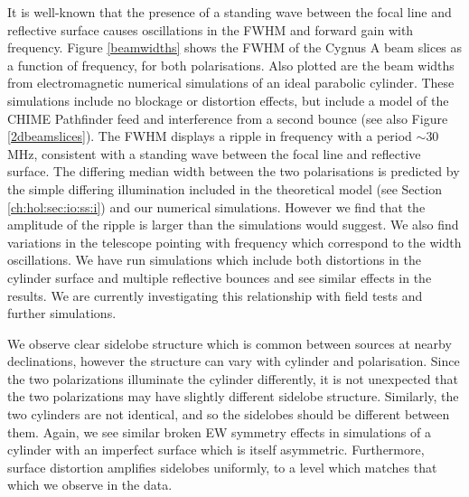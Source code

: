 It is well-known \citep{wander1, wander2} that the presence of a standing wave between the focal line and reflective surface causes oscillations in the FWHM and forward gain with frequency. Figure \ref{beamwidths} shows the FWHM of the Cygnus A beam slices as a function of frequency, for both polarisations. Also plotted are the beam widths from electromagnetic numerical simulations of an ideal parabolic cylinder. These simulations include no blockage or distortion effects, but include a model of the CHIME Pathfinder feed \citep{meiling} and interference from a second bounce (see also Figure \ref{2dbeamslices}). The FWHM displays a ripple in frequency with a period $\sim$30 MHz, consistent with a standing wave between the focal line and reflective surface. The differing median width between the two polarisations is predicted by the simple differing illumination included in the theoretical model (see Section \ref{ch:hol:sec:io:ss:i}) and our numerical simulations. However we find that the amplitude of the ripple is larger than the simulations would suggest. We also find variations in the telescope pointing with frequency which correspond to the width oscillations. We have run simulations which include both distortions in the cylinder surface and multiple reflective bounces and see similar effects in the results. We are currently investigating this relationship with field tests and further simulations.

We observe clear sidelobe structure which is common between sources at nearby declinations, however the structure can vary with cylinder and polarisation. Since the two polarizations illuminate the cylinder differently, it is not unexpected that the two polarizations may have slightly different sidelobe structure. Similarly, the two cylinders are not identical, and so the sidelobes should be different between them. Again, we see similar broken EW symmetry effects in simulations of a cylinder with an imperfect surface which is itself asymmetric. Furthermore, surface distortion amplifies sidelobes uniformly, to a level which matches that which we observe in the data.

